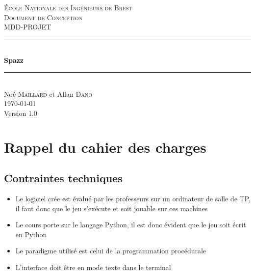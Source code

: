 \documentclass[a4paper,11pt]{scrartcl}
\begin{document}
\begin{titlepage}

\newcommand{\HRule}{\rule{\linewidth}{0.5mm}} %

\center %


\textsc{\LARGE École Nationale des Ingénieurs de Brest}\\[1.5cm]
\textsc{\Large Document de Conception}\\[0.5cm]
\textsc{\large MDD-PROJET}\\[0.5cm]


\HRule \\[0.4cm]
{\huge \bfseries Spazz}\\[0.4cm] %
\HRule \\[1.5cm]

\Large
Noé \textsc{Maillard} et Allan \textsc{Dano}\\[3cm]


{\today}\\[3cm] %

{\large Version 1.0}


\vfill

\end{titlepage}

\tableofcontents
\newpage
\section{Rappel du cahier des charges}

\subsection{Contraintes techniques}

\begin{itemize}[label = $\bullet$]
	\item Le logiciel crée est évalué par les professeurs sur un ordinateur de salle de TP, il faut donc que le jeu s’exécute et soit jouable sur ces machines
	\item Le cours porte sur le langage Python, il est donc évident que le jeu soit écrit en Python
	\item Le paradigme utilisé est celui de la programmation procédurale
	\item L'interface doit être en mode texte dans le terminal
\end{itemize}
\end{document}
